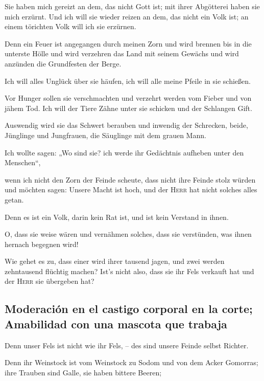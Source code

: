 Sie haben mich gereizt an dem, das nicht Gott ist; mit
ihrer Abgötterei haben sie mich erzürnt. Und ich will sie wieder reizen
an dem, das nicht ein Volk ist; an einem törichten Volk will ich sie
erzürnen.

 Denn ein Feuer ist angegangen durch meinen Zorn und wird
brennen bis in die unterste Hölle und wird verzehren das Land mit seinem
Gewächs und wird anzünden die Grundfesten der Berge.

 Ich will alles Unglück über sie häufen, ich will alle
meine Pfeile in sie schießen.

 Vor Hunger sollen sie verschmachten und verzehrt werden
vom Fieber und von jähem Tod. Ich will der Tiere Zähne unter sie
schicken und der Schlangen Gift.

 Auswendig wird sie das Schwert berauben und inwendig der
Schrecken, beide, Jünglinge und Jungfrauen, die Säuglinge mit dem grauen
Mann.

 Ich wollte sagen: „Wo sind sie? ich werde ihr Gedächtnis
aufheben unter den Menschen``,

 wenn ich nicht den Zorn der Feinde scheute, dass nicht
ihre Feinde stolz würden und möchten sagen: Unsere Macht ist hoch, und
der \textsc{Herr} hat nicht solches alles getan.

 Denn es ist ein Volk, darin kein Rat ist, und ist kein
Verstand in ihnen.

 O, dass sie weise wären und vernähmen solches, dass sie
verstünden, was ihnen hernach begegnen wird!

 Wie gehet es zu, dass einer wird ihrer tausend jagen,
und zwei werden zehntausend flüchtig machen? Ist's nicht also, dass sie
ihr Fels verkauft hat und der \textsc{Herr} sie übergeben hat?

\hypertarget{moderaciuxf3n-en-el-castigo-corporal-en-la-corte-amabilidad-con-una-mascota-que-trabaja}{%
\subsection{Moderación en el castigo corporal en la corte; Amabilidad
con una mascota que
trabaja}\label{moderaciuxf3n-en-el-castigo-corporal-en-la-corte-amabilidad-con-una-mascota-que-trabaja}}

 Denn unser Fels ist nicht wie ihr Fels, -- des sind
unsere Feinde selbst Richter.

 Denn ihr Weinstock ist vom Weinstock zu Sodom und von
dem Acker Gomorras; ihre Trauben sind Galle, sie haben bittere Beeren;


